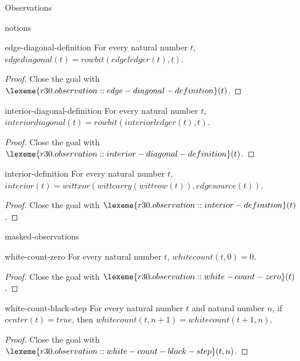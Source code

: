\begin{lexlean}{Observations}
\begin{section}{notions}
\begin{lemma}{edge-diagonal-definition}
For every natural number \(t\), \(edgediagonal(t) = rowbit(edgeledger(t), t)\).
\begin{proof}
Close the goal with \(\lexeme{r30.observation::edge-diagonal-definition}(t)\).
\end{proof}
\end{lemma}

\begin{lemma}{interior-diagonal-definition}
For every natural number \(t\), \(interiordiagonal(t) = rowbit(interiorledger(t), t)\).
\begin{proof}
Close the goal with \(\lexeme{r30.observation::interior-diagonal-definition}(t)\).
\end{proof}
\end{lemma}

\begin{lemma}{interior-definition}
For every natural number \(t\), \(interior(t) = wittxor(wittcarry(wittrow(t)), edgesource(t))\).
\begin{proof}
Close the goal with \(\lexeme{r30.observation::interior-definition}(t)\).
\end{proof}
\end{lemma}

\end{section}

\begin{section}{masked-observations}

\begin{theorem}{white-count-zero}
For every natural number \(t\), \(whitecount(t, 0) = 0\).
\begin{proof}
Close the goal with \(\lexeme{r30.observation::white-count-zero}(t)\).
\end{proof}
\end{theorem}

\begin{theorem}{white-count-black-step}
For every natural number \(t\) and natural number \(n\), if \(center(t) = true\), then \(whitecount(t, n + 1) = whitecount(t + 1, n)\).
\begin{proof}
Close the goal with \(\lexeme{r30.observation::white-count-black-step}(t, n)\).
\end{proof}
\end{theorem}


\end{section}
\end{lexlean}
